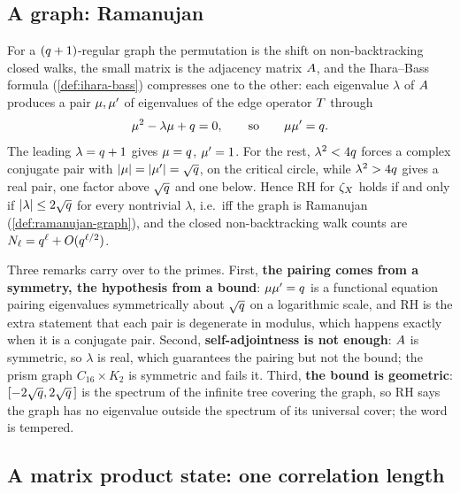 \subsection{A graph: Ramanujan}

\begin{observation}
\label{obs:rh-graph-ramanujan}
For a $(q+1)$-regular graph the permutation is the shift on non-backtracking closed
walks, the small matrix is the adjacency matrix $A$, and the Ihara--Bass formula
(\cref{def:ihara-bass}) compresses one to the other: each eigenvalue $\lambda$ of
$A$ produces a pair $\mu,\mu'$ of eigenvalues of the edge operator $T$
through
\[
\mu^2 - \lambda\mu + q = 0,\qquad\text{so}\qquad
\mu\mu' = q .
\]
The leading $\lambda = q+1$ gives $\mu = q$, $\mu' = 1$. For the rest,
$\lambda^2 < 4q$ forces a complex conjugate pair with $|\mu| = |\mu'| =
\sqrt{q}$, on the critical circle, while $\lambda^2 > 4q$ gives a real pair, one
factor above $\sqrt{q}$ and one below. Hence RH for $\zeta_{X}$ holds if and only if
$|\lambda|\le2\sqrt{q}$ for every nontrivial $\lambda$, i.e.\ iff the graph is
Ramanujan (\cref{def:ramanujan-graph}), and the closed non-backtracking walk counts
are $N_{\ell} = q^{\ell} + O(q^{\ell/2})$.
\end{observation}

Three remarks carry over to the primes. First, \textbf{the pairing comes from a
symmetry, the hypothesis from a bound}: $\mu\mu' = q$ is a functional
equation pairing eigenvalues symmetrically about $\sqrt{q}$ on a logarithmic scale,
and RH is the extra statement that each pair is degenerate in modulus, which happens
exactly when it is a conjugate pair. Second, \textbf{self-adjointness is not enough}:
$A$ is symmetric, so $\lambda$ is real, which guarantees the pairing but not the
bound; the prism graph $C_{16}\times K_2$ is symmetric and fails it. Third,
\textbf{the bound is geometric}: $[-2\sqrt{q},2\sqrt{q}\,]$ is the spectrum of the
infinite tree covering the graph, so RH says the graph has no eigenvalue outside the
spectrum of its universal cover; the word is tempered.

\subsection{A matrix product state: one correlation length}

